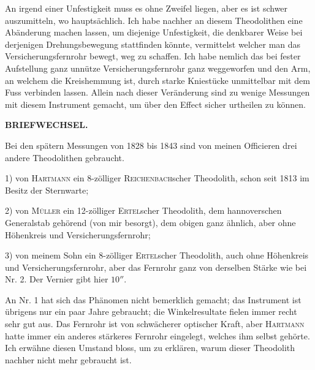 \par\noindent\hspace*{\parindent}An irgend einer Unfestigkeit muss es ohne Zweifel liegen, aber es ist schwer auszumitteln, wo hauptsächlich. Ich habe nachher an diesem Theodolithen eine Abänderung machen lassen, um diejenige Unfestigkeit, die denkbarer Weise bei derjenigen Drehungsbewegung stattfinden könnte, vermittelst welcher man das Versicherungsfernrohr bewegt, weg zu schaffen. Ich habe nemlich das bei fester Aufstellung ganz unnütze Versicherungsfernrohr ganz weggeworfen und den Arm, an welchem die Kreishemmung ist, durch starke Kniestücke unmittelbar mit dem Fuss verbinden lassen. Allein nach dieser Veränderung sind zu wenige Messungen mit diesem Instrument gemacht, um über den Effect sicher urtheilen zu können.

\par\clearpage
\noindent{}\hfill{\small\textbf{BRIEFWECHSEL.}}\hfill\null\par\medskip
\par\noindent\hspace*{\parindent}Bei den spätern Messungen von 1828 bis 1843 sind von meinen Officieren drei andere Theodolithen gebraucht.
\par\noindent\hspace*{\parindent}1) von \textsc{Hartmann} ein 8-zölliger \textsc{Reichenbach}scher Theodolith, schon seit 1813 im Besitz der Sternwarte;
\par\noindent\hspace*{\parindent}2) von \textsc{Müller} ein 12-zölliger \textsc{Ertel}scher Theodolith, dem hannoverschen Generalstab gehörend (von mir besorgt), dem obigen ganz ähnlich, aber ohne Höhenkreis und Versicherungsfernrohr;
\par\noindent\hspace*{\parindent}3) von meinem Sohn ein 8-zölliger \textsc{Ertel}scher Theodolith, auch ohne Höhenkreis und Versicherungsfernrohr, aber das Fernrohr ganz von derselben Stärke wie bei Nr. 2. Der Vernier gibt hier $10''$.

\par\noindent\hspace*{\parindent}An Nr. 1 hat sich das Phänomen nicht bemerklich gemacht; das Instrument ist übrigens nur ein paar Jahre gebraucht; die Winkelresultate fielen immer recht sehr gut aus. Das Fernrohr ist von schwächerer optischer Kraft, aber \textsc{Hartmann} hatte immer ein anderes stärkeres Fernrohr eingelegt, welches ihm selbst gehörte. Ich erwähne diesen Umstand bloss, um zu erklären, warum dieser Theodolith nachher nicht mehr gebraucht ist.

